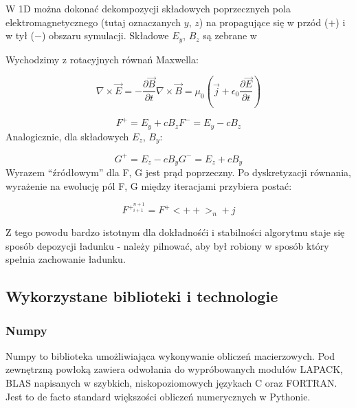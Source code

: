 W 1D można dokonać dekompozycji składowych poprzecznych pola elektromagnetycznego (tutaj oznaczanych $y$, $z$) na
propagujące się w przód ($+$) i w tył ($-$) obszaru symulacji. Składowe $E_y$, $B_z$ są zebrane w %

Wychodzimy z rotacyjnych równań Maxwella:

\begin{equation}
    \nabla \times \vec{E} = -\frac{\partial \vec{B}}{\partial t}
    \nabla \times \vec{B} = \mu_0 (\vec{j} + \epsilon_0 \frac{\partial \vec{E}}{\partial t})
    \label{eqn:Maxwell-rotation-derivation}
\end{equation}


\begin{equation}
    F^{+} = E_y + c B_z
    F^{-} = E_y - c B_z
    \label{eqn:Birdsall-electromagnetic-quantities}
\end{equation}
Analogicznie, dla składowych $E_z$, $B_y$:

\begin{equation}
    G^{+} = E_z - c B_y
    G^{-} = E_z + c B_y
    \label{eqn:Birdsall-electromagnetic-quantities-alternate-axes}
\end{equation}
Wyrazem ``źródłowym'' dla F, G jest prąd poprzeczny. Po dyskretyzacji równania, wyrażenie na ewolucję pól F, G między
iteracjami przybiera postać:

\begin{equation}
    F^{+}^{n+1}_{i+1} = F^{+}<++>_{n} + j%
\end{equation}

Z tego powodu bardzo istotnym dla dokładnośći i stabilności algorytmu staje się sposób depozycji ładunku - należy pilnować,
aby był robiony w sposób który spełnia zachowanie ładunku.


\subsection{Wykorzystane biblioteki i technologie}

\subsubsection{Numpy}
Numpy to biblioteka umożliwiająca wykonywanie obliczeń macierzowych. Pod zewnętrzną powłoką zawiera odwołania do
wypróbowanych modułów LAPACK, BLAS %
napisanych w szybkich, niskopoziomowych językach C oraz FORTRAN. Jest to de facto standard większości obliczeń
numerycznych w Pythonie.
